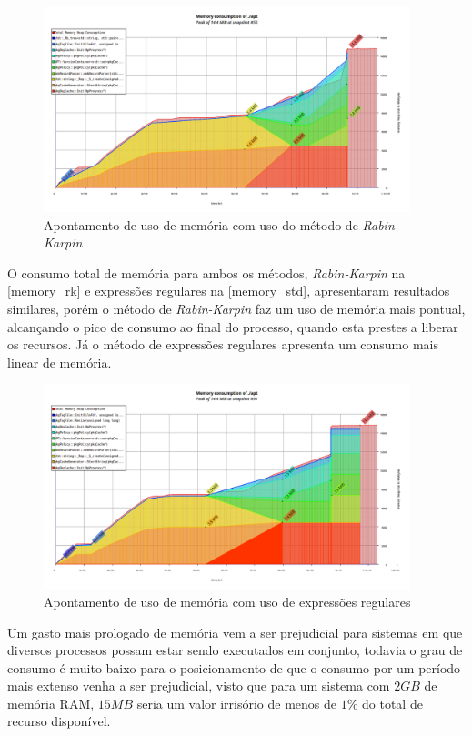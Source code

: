 \begin{figure}[htbp]
  \centering
  \includegraphics[width=0.95\textwidth]{figuras/memory_rk.png}
  \caption{Apontamento de uso de memória com uso do método de \textit{Rabin-Karpin}}
  \label{memory_rk}
\end{figure}

O consumo total de memória para ambos os métodos, \textit{Rabin-Karpin} na \autoref{memory_rk} e expressões regulares na \autoref{memory_std},  apresentaram resultados similares, porém o método de \textit{Rabin-Karpin} faz um uso de memória mais pontual, alcançando o pico de consumo ao final do processo, quando esta prestes a liberar os recursos. Já o método de expressões regulares apresenta um consumo mais linear de memória. 


\begin{figure}[htbp]
  \centering
  \includegraphics[width=0.95\textwidth]{figuras/memory_regex.png}
  \caption{Apontamento de uso de memória com uso de expressões regulares}
  \label{memory_std}
\end{figure}

Um gasto mais prologado de memória vem a ser prejudicial para sistemas em que diversos processos possam estar sendo executados em conjunto, todavia o grau de consumo é muito baixo para o posicionamento de que o consumo por um período mais extenso venha a ser prejudicial, visto que para um sistema com $2GB$ de memória RAM, $15MB$ seria um valor irrisório de menos de $1\%$ do total de recurso disponível.

